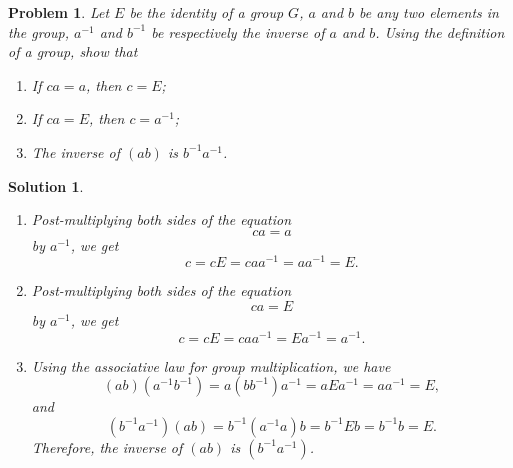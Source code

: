 \documentclass[UTF8,10pt,a4paper]{article}
\theoremstyle{Problem}
\newtheorem{prob}{Problem}
\theoremstyle{Solution}
\newtheorem*{sol}{Solution}
\begin{document}
\thispagestyle{FirstPageStyle}
\begin{prob}
    Let $E$ be the identity of a group $G$, $a$ and $b$ be any two elements in the group, $a^{-1}$ and $b^{-1}$ be respectively the inverse of $a$ and $b$. Using the definition of a group, show that
    \begin{enumerate}
        \item[(1)] If $ca=a$, then $c=E$;
        \item[(2)] If $ca=E$, then $c=a^{-1}$;
        \item[(3)] The inverse of $(ab)$ is $b^{-1}a^{-1}$.
    \end{enumerate}
\end{prob}
\begin{sol}
    \begin{enumerate}
        \item[(1)] Post-multiplying both sides of the equation
              \begin{equation}
                  ca=a
              \end{equation}
              by $a^{-1}$, we get
              \begin{equation}
                  c=cE=caa^{-1}=aa^{-1}=E.
              \end{equation}
        \item[(2)] Post-multiplying both sides of the equation
              \begin{equation}
                  ca=E
              \end{equation}
              by $a^{-1}$, we get
              \begin{equation}
                  c=cE=caa^{-1}=Ea^{-1}=a^{-1}.
              \end{equation}
        \item[(3)] Using the associative law for group multiplication, we have
              \begin{equation}
                  (ab)(a^{-1}b^{-1})=a(bb^{-1})a^{-1}=aEa^{-1}=aa^{-1}=E,
              \end{equation}
              and
              \begin{equation}
                  (b^{-1}a^{-1})(ab)=b^{-1}(a^{-1}a)b=b^{-1}Eb=b^{-1}b=E.
              \end{equation}
              Therefore, the inverse of $(ab)$ is $(b^{-1}a^{-1})$.
    \end{enumerate}
\end{sol}
\end{document}
